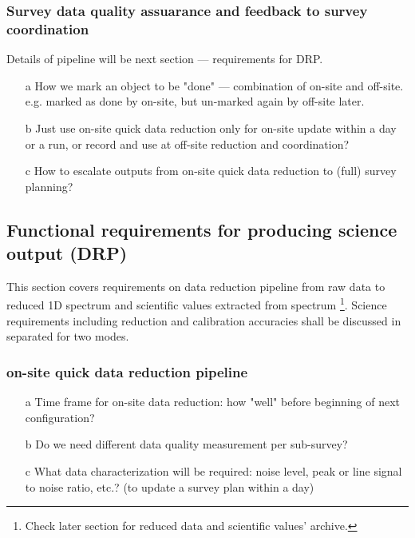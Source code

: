\documentclass[a4paper,notitlepage]{article}
\begin{document}
\subsubsection{Survey data quality assuarance and feedback to survey coordination}

Details of pipeline will be next section --- requirements for DRP. 

\begin{enumerate}
  \item[a] How we mark an object to be "done" --- 
    combination of on-site and off-site. 
    e.g. marked as done by on-site, but un-marked again by off-site later.
  \item[b] Just use on-site quick data reduction only for on-site update 
    within a day or a run, or record and use at off-site reduction and 
    coordination?
  \item[c] How to escalate outputs from on-site quick data reduction to 
    (full) survey planning?
\end{enumerate}


\subsection{Functional requirements for producing science output (DRP)}

This section covers requirements on data reduction pipeline from raw data to 
reduced 1D spectrum and scientific values extracted from spectrum 
\footnote{Check later section for reduced data and scientific values' archive.}.
Science requirements including reduction and calibration accuracies shall 
be discussed in separated for two modes. 

\subsubsection{on-site quick data reduction pipeline}

\begin{enumerate}
  \item[a] Time frame for on-site data reduction: 
    how "well" before beginning of next configuration?
  \item[b] Do we need different data quality measurement per sub-survey? 
  \item[c] What data characterization will be required: 
    noise level, peak or line signal to noise ratio, etc.?
    (to update a survey plan within a day)
\end{enumerate}
\end{document}

